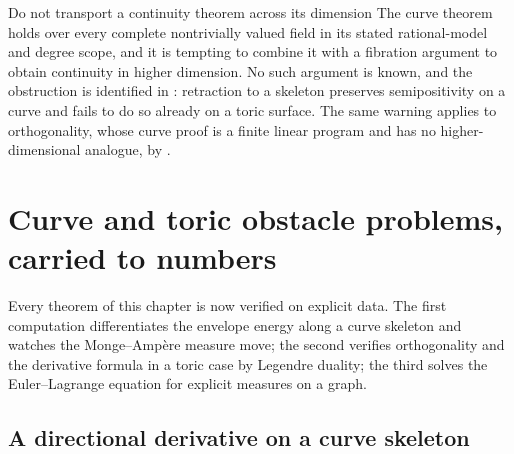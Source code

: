 \begin{warning}{Do not transport a continuity theorem across its dimension}
The curve theorem  holds over every complete
nontrivially valued field in its stated rational-model and degree scope,
and it is
tempting to combine it with a fibration
argument to obtain continuity in higher dimension.  No such argument is
known, and the obstruction is identified in
: retraction to a skeleton preserves
semipositivity on a curve and fails to do so already on a toric surface.
The same warning applies to orthogonality, whose curve proof
 is a finite linear program and has
no higher-dimensional analogue, by
.
\end{warning}

\section{Curve and toric obstacle problems, carried to numbers}
\label{sec:ch27-worked}

Every theorem of this chapter is now verified on explicit data.  The first
computation differentiates the envelope energy along a curve skeleton and
watches the Monge--Amp\`ere measure move; the second verifies orthogonality
and the derivative formula in a toric case by Legendre duality; the third
solves the Euler--Lagrange equation for explicit measures on a graph.

\subsection{A directional derivative on a curve skeleton}
\label{sec:ch27-curve-numbers}

